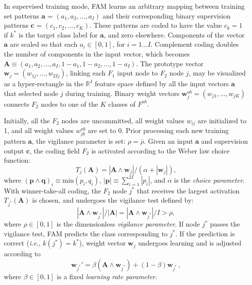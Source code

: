 In supervised training mode, FAM learns an arbitrary mapping between training set patterns $\textbf{a}$ = $(a_1, a_2, ..., a_I)$ and their corresponding binary supervision patterns $\textbf{c}$ = $(c_1, c_2, ..., c_K)$.
These patterns are coded to have the value $c_k = 1$ if $k^*$ is the target class label for $\textbf{a}$, and zero elsewhere.
Components of the vector $\textbf{a}$ are scaled so that each $a_i \in [0,1]$, for $i=1 \ldots I$.
Complement coding doubles the number of components in the input vector, which becomes $\textbf{A} \equiv (a_1, a_2, ..., a_I, 1-a_1, 1-a_2,..., 1-a_I)$.
The prototype vector $\textbf{w}_{j} = (w_{1j}, ..., w_{2Ij})$, linking each $F_1$ input node to $F_2$ node $j$, may be visualized as a hyper-rectangle in the $\mathbb{R}^I$ feature space defined by all the input vectors $\textbf{a}$ that selected node $j$ during training.
Binary weight vectors $\textbf{w}^{ab}_{j} = (w_{j1}, ..., w_{jK})$ connects $F_2$ nodes to one of the $K$ classes of $F^{ab}$.

Initially, all the $F_2$ nodes are uncommitted, all weight values $w_{ij}$ are initialized to 1, and all weight values $w^{ab}_{jk}$ are set to 0.
Prior processing each new training pattern $\textbf{a}$, the vigilance parameter is set: $\rho=\bar{\rho}$.
Given an input $\textbf{a}$ and supervision output $\textbf{c}$, the coding field $F_2$ is activated according to the Weber law choice function:
\begin{equation}
	T_j(\textbf{A}) = |\textbf{A}\wedge\textbf{w}_{j}| / (\alpha + 			
										|\textbf{w}_{j}|),
	\label{eq:choice}
\end{equation}
where $(\textbf{p}\wedge\textbf{q})_i \equiv \textrm{min} (p_i,q_i)$, $|\textbf{p}| \equiv \sum^{2I}_{i=1} |p_i|$, and $\alpha$ is the \emph{choice parameter}.
With winner-take-all coding, the $F_2$ node $j^*$ that receives the largest activation $T_{j^*}(\textbf{A})$ is chosen, and undergoes the vigilance test defined by: 
\begin{equation}
	|\textbf{A}\wedge\textbf{w}_{j^*}| / |\textbf{A}|=|\textbf{A} \wedge 
		\textbf{w}_{j^*}|/I > \rho,
	\label{eq:match}
\end{equation}
where $\rho \in [0,1]$ is the dimensionless \emph{vigilance parameter}.
If node $j^*$ passes the vigilance test, FAM predicts the class corresponding to $j^*$.
If the prediction is correct (\emph{i.e.}, $k(j^*)=k^*$), weight vector $\textbf{w}_j$ undergoes learning and is adjusted according to
\begin{equation}
  \textbf{w}_{j^*}' = \beta(\textbf{A} \wedge \textbf{w}_{j^*}) + 
   										(1 - \beta) \textbf{w}_{j^*} \,,
  \label{eq:learning}
\end{equation}
where $\beta \in [0,1]$ is a fixed \emph{learning rate parameter}.

